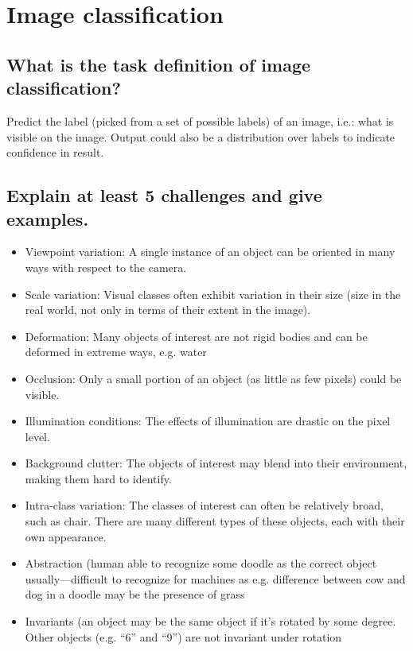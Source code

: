 \section{Image classification}
\subsection{What is the task definition of image classification?}
Predict the label (picked from a set of possible labels) of an image, i.e.: what is visible on the image. Output could also be a distribution over labels to indicate confidence in result.

\subsection{Explain at least 5 challenges and give examples.}
\begin{itemize}
\item Viewpoint variation: A single instance of an object can be oriented in many ways with respect to the camera.
\item Scale variation: Visual classes often exhibit variation in their size (size in the real world, not only in terms of their extent in the image).
\item Deformation: Many objects of interest are not rigid bodies and can be deformed in extreme ways, e.g. water
\item Occlusion: Only a small portion of an object (as little as few pixels) could be visible.
\item Illumination conditions: The effects of illumination are drastic on the pixel level.
\item Background clutter: The objects of interest may blend into their environment, making them hard to identify.
\item Intra-class variation: The classes of interest can often be relatively broad, such as chair. There are many different types of these objects, each with their own appearance.
\item Abstraction (human able to recognize some doodle as the correct object usually---difficult to recognize for machines as e.g. difference between cow and dog in a doodle may be the presence of grass
\item Invariants (an object may be the same object if it's rotated by some degree. Other objects (e.g. ``6'' and ``9'') are not invariant under rotation
\end{itemize}

